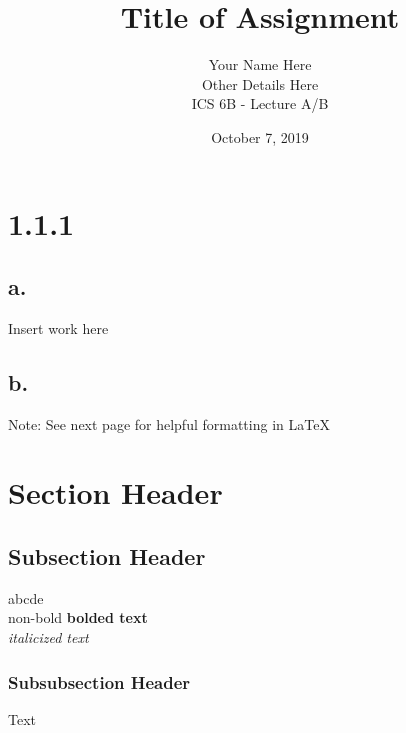\documentclass{article}
\begin{document}
\title{Title of Assignment}
\author{Your Name Here\\
        Other Details Here\\
        ICS 6B - Lecture A/B}
\date{October 7, 2019} %
\maketitle

\section*{1.1.1}                        %
\subsection*{a.}
Insert work here
\subsection*{b.}
Note: See next page for helpful formatting in LaTeX
\pagebreak                              %

\section{Section Header}                %
\subsection{Subsection Header}          %
abcde\\                                 %
non-bold \textbf{bolded text}\\         %
\textit{italicized text}                %

\subsubsection{Subsubsection Header}    %
Text
\end{document}
